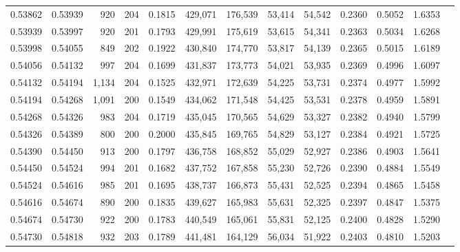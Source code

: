 \begin{tabular}{rrrrrrrrrrrrr}
0.53862 & 0.53939 &   920 & 204 &                                     0.1815 & 429,071 & 176,539 &  53,414 &  54,542 & 0.2360 & 0.5052 & 1.6353 \\
0.53939 & 0.53997 &   920 & 201 &                                     0.1793 & 429,991 & 175,619 &  53,615 &  54,341 & 0.2363 & 0.5034 & 1.6268 \\
0.53998 & 0.54055 &   849 & 202 &                                     0.1922 & 430,840 & 174,770 &  53,817 &  54,139 & 0.2365 & 0.5015 & 1.6189 \\
0.54056 & 0.54132 &   997 & 204 &                                     0.1699 & 431,837 & 173,773 &  54,021 &  53,935 & 0.2369 & 0.4996 & 1.6097 \\
0.54132 & 0.54194 & 1,134 & 204 &                                     0.1525 & 432,971 & 172,639 &  54,225 &  53,731 & 0.2374 & 0.4977 & 1.5992 \\
0.54194 & 0.54268 & 1,091 & 200 &                                     0.1549 & 434,062 & 171,548 &  54,425 &  53,531 & 0.2378 & 0.4959 & 1.5891 \\
0.54268 & 0.54326 &   983 & 204 &                                     0.1719 & 435,045 & 170,565 &  54,629 &  53,327 & 0.2382 & 0.4940 & 1.5799 \\
0.54326 & 0.54389 &   800 & 200 &                                     0.2000 & 435,845 & 169,765 &  54,829 &  53,127 & 0.2384 & 0.4921 & 1.5725 \\
0.54390 & 0.54450 &   913 & 200 &                                     0.1797 & 436,758 & 168,852 &  55,029 &  52,927 & 0.2386 & 0.4903 & 1.5641 \\
0.54450 & 0.54524 &   994 & 201 &                                     0.1682 & 437,752 & 167,858 &  55,230 &  52,726 & 0.2390 & 0.4884 & 1.5549 \\
0.54524 & 0.54616 &   985 & 201 &                                     0.1695 & 438,737 & 166,873 &  55,431 &  52,525 & 0.2394 & 0.4865 & 1.5458 \\
0.54616 & 0.54674 &   890 & 200 &                                     0.1835 & 439,627 & 165,983 &  55,631 &  52,325 & 0.2397 & 0.4847 & 1.5375 \\
0.54674 & 0.54730 &   922 & 200 &                                     0.1783 & 440,549 & 165,061 &  55,831 &  52,125 & 0.2400 & 0.4828 & 1.5290 \\
0.54730 & 0.54818 &   932 & 203 &                                     0.1789 & 441,481 & 164,129 &  56,034 &  51,922 & 0.2403 & 0.4810 & 1.5203 \\

\end{tabular}
